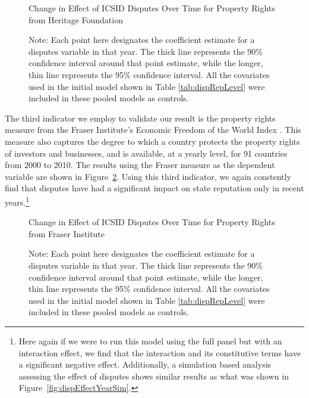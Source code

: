 \documentclass[12pt,onesided]{amsart}
\begin{document}
\begin{figure}[ht]
	\centering
	\caption{Change in Effect of ICSID Disputes Over Time for Property Rights from Heritage Foundation}
	\label{fig:dispEffectYear_herit}
	\resizebox{1\textwidth}{!}{}
	\caption*{Note: Each point here designates the coefficient estimate for a disputes variable in that year. The thick line represents the 90\% confidence interval around that point estimate, while the longer, thin line represents the 95\% confidence interval. All the covariates used in the initial model shown in Table \ref{tab:dispRepLevel} were included in these pooled models as controls.}
\end{figure}
\FloatBarrier

The third indicator we employ to validate our result is the property rights measure from the Fraser Institute's Economic Freedom of the World Index \citep{gwartney:lawson:2004}. This measure also captures the degree to which a country protects the property rights of investors and businesses, and is available, at a yearly level, for 91 countries from 2000 to 2010. The results using the Fraser measure as the dependent variable are shown in Figure~\ref{fig:dispEffectYear_fraser}. Using this third indicator, we again constently find that disputes have had a significant impact on state reputation only in recent years.\footnote{Here again if we were to run this model using the full panel but with an interaction effect, we find that the interaction and its constitutive terms have a significant negative effect. Additionally, a simulation based analysis assessing the effect of disputes shows similar results as what was shown in Figure~\ref{fig:dispEffectYearSim}.} 

\begin{figure}[ht]
	\centering
	\caption{Change in Effect of ICSID Disputes Over Time for Property Rights from Fraser Institute}
	\label{fig:dispEffectYear_fraser}
	\resizebox{1\textwidth}{!}{}
	\caption*{Note: Each point here designates the coefficient estimate for a disputes variable in that year. The thick line represents the 90\% confidence interval around that point estimate, while the longer, thin line represents the 95\% confidence interval. All the covariates used in the initial model shown in Table \ref{tab:dispRepLevel} were included in these pooled models as controls.}
\end{figure}
\FloatBarrier

\end{document}
